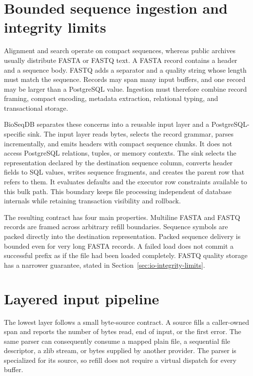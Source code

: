 \section{Bounded sequence ingestion and integrity limits}
\label{sec:io-loading-contract}

Alignment and search operate on compact sequences, whereas public archives
usually distribute FASTA or FASTQ text. A FASTA record contains a header and a
sequence body. FASTQ adds a separator and a quality string whose length must
match the sequence. Records may span many input buffers, and one record may be
larger than a PostgreSQL value. Ingestion must therefore combine record
framing, compact encoding, metadata extraction, relational typing, and
transactional storage.

BioSeqDB separates these concerns into a reusable input layer and a
PostgreSQL-specific sink. The input layer reads bytes, selects the record
grammar, parses incrementally, and emits headers with compact sequence chunks.
It does not access PostgreSQL relations, tuples, or memory contexts. The sink
selects the representation declared by the destination sequence column,
converts header fields to SQL values, writes sequence fragments, and creates
the parent row that refers to them. It evaluates defaults and the executor row
constraints available to this bulk path. This boundary keeps file processing
independent of database internals while retaining transaction visibility and
rollback.

The resulting contract has four main properties. Multiline FASTA and FASTQ
records are framed across arbitrary refill boundaries. Sequence symbols are
packed directly into the destination representation. Packed sequence delivery
is bounded even for very long FASTA records. A failed load does not commit a
successful prefix as if the file had been loaded completely. FASTQ quality
storage has a narrower guarantee, stated in
Section~\ref{sec:io-integrity-limits}.

\section{Layered input pipeline}
\label{sec:io-reader-architecture}

The lowest layer follows a small byte-source contract. A source fills a
caller-owned span and reports the number of bytes read, end of input, or the
first error. The same parser can consequently consume a mapped plain file, a
sequential file descriptor, a zlib stream, or bytes supplied by another
provider. The parser is specialized for its source, so refill does not require
a virtual dispatch for every buffer.

